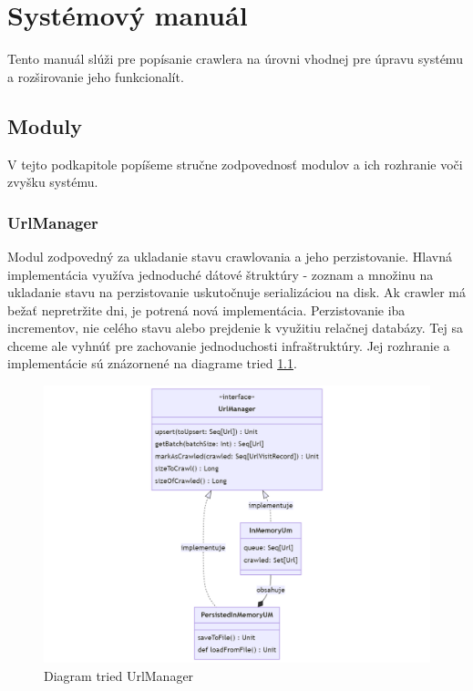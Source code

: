 
\chapter{Systémový manuál}

Tento manuál slúži pre popísanie crawlera na úrovni vhodnej pre úpravu systému a rozširovanie jeho funkcionalít. 


\section{Moduly}
V tejto podkapitole popíšeme stručne zodpovednosť modulov a ich rozhranie voči zvyšku systému. 

\subsection{UrlManager}
Modul zodpovedný za ukladanie stavu crawlovania a jeho perzistovanie. Hlavná implementácia využíva jednoduché dátové štruktúry - zoznam a množinu na ukladanie stavu na perzistovanie uskutočnuje serializáciou na disk. Ak crawler má bežať nepretržite dni, je potrená nová implementácia. Perzistovanie iba incrementov, nie celého stavu alebo prejdenie k využitiu relačnej databázy. Tej sa chceme ale vyhnúť pre zachovanie jednoduchosti infraštruktúry. Jej rozhranie a implementácie sú znázornené na diagrame tried \ref{o:urlManChart}. 

\begin{figure}[!ht]
    \centering
    \includegraphics[width=1\textwidth]{figures/urlManagerChart.png}
    \caption{Diagram tried UrlManager\label{o:urlManChart}}
\end{figure}


